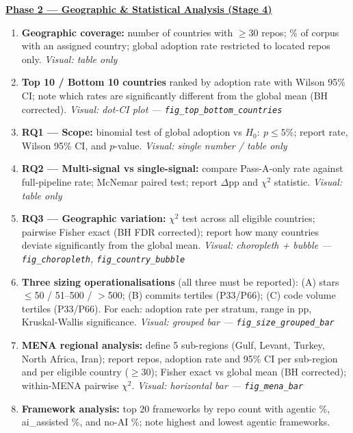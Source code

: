 \documentclass[9pt,a4paper]{article}
\begin{document}
\vspace{4pt}
\noindent\textbf{\underline{Phase 2 --- Geographic \& Statistical Analysis (Stage 4)}}
\begin{enumerate}[leftmargin=1.5em,itemsep=1pt,topsep=2pt]
  \item \textbf{Geographic coverage:} number of countries with $\geq$30 repos; \% of corpus
        with an assigned country; global adoption rate restricted to located repos only.
        \textit{Visual: table only}
  \item \textbf{Top 10 / Bottom 10 countries} ranked by adoption rate with Wilson 95\% CI;
        note which rates are significantly different from the global mean (BH corrected).
        \textit{Visual: dot-CI plot --- \texttt{fig\_top\_bottom\_countries}}
  \item \textbf{RQ1 --- Scope:} binomial test of global adoption vs $H_0{:}\ p \leq 5\%$;
        report rate, Wilson 95\% CI, and $p$-value.
        \textit{Visual: single number / table only}
  \item \textbf{RQ2 --- Multi-signal vs single-signal:} compare Pass-A-only rate against
        full-pipeline rate; McNemar paired test; report $\Delta$pp and $\chi^2$ statistic.
        \textit{Visual: table only}
  \item \textbf{RQ3 --- Geographic variation:} $\chi^2$ test across all eligible countries;
        pairwise Fisher exact (BH FDR corrected); report how many countries deviate
        significantly from the global mean.
        \textit{Visual: choropleth + bubble --- \texttt{fig\_choropleth}, \texttt{fig\_country\_bubble}}
  \item \textbf{Three sizing operationalisations} (all three must be reported):
        (A) stars $\leq$50 / 51--500 / $>$500;\;
        (B) commits tertiles (P33/P66);\;
        (C) code volume tertiles (P33/P66).
        For each: adoption rate per stratum, range in pp, Kruskal-Wallis significance.
        \textit{Visual: grouped bar --- \texttt{fig\_size\_grouped\_bar}}
  \item \textbf{MENA regional analysis:} define 5 sub-regions (Gulf, Levant, Turkey,
        North Africa, Iran); report repos, adoption rate and 95\% CI per sub-region and
        per eligible country ($\geq$30); Fisher exact vs global mean (BH corrected);
        within-MENA pairwise $\chi^2$.
        \textit{Visual: horizontal bar --- \texttt{fig\_mena\_bar}}
  \item \textbf{Framework analysis:} top 20 frameworks by repo count with agentic \%,
        ai\_assisted \%, and no-AI \%; note highest and lowest agentic frameworks.

\end{enumerate}
\end{document}
